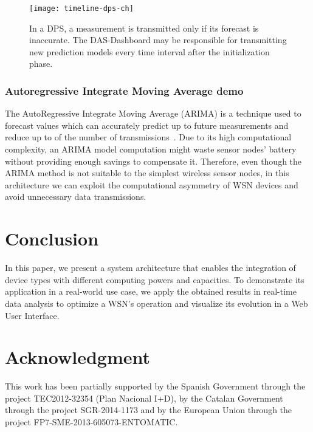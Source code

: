 \documentclass[conference, letterpaper]{IEEEtran}
\newcommand{\dashboard}[1]{DAS-Dashboard}
\begin{document}
\begin{figure}[t]
	\centering
	\texttt{[image: timeline-dps-ch]}
	\caption{In a DPS, a measurement is transmitted only if its
	forecast is inaccurate. The \dashboard{} may be responsible for 
transmitting new prediction models every time interval after the 
initialization phase.}
	\label{fig:timeline-dps-ch}
\end{figure}

\subsubsection{Autoregressive Integrate Moving Average demo}

The AutoRegressive Integrate Moving Average (ARIMA) is a technique used to forecast values which can accurately predict up to  future measurements and reduce up to  of the number of transmissions~\cite{Dias2016}. Due to its high computational complexity, an ARIMA model computation might waste sensor nodes' battery without providing enough savings to compensate it. Therefore, even though the ARIMA method is not suitable to the simplest wireless sensor nodes, in this architecture we can exploit the computational asymmetry of WSN devices and avoid unnecessary data transmissions.

\section{Conclusion}
In this paper, we present a system architecture that enables the integration of device types with different computing powers and capacities. To demonstrate its application in a real-world use case, we apply the obtained results in real-time data analysis to optimize a WSN's operation and visualize its evolution in a Web User Interface.


\section*{Acknowledgment}

This work has been partially supported by the Spanish Government through the 
project TEC2012-32354 (Plan Nacional I+D), by the Catalan Government 
through the project SGR-2014-1173 and by the European Union through the 
project FP7-SME-2013-605073-ENTOMATIC.



\end{document}
